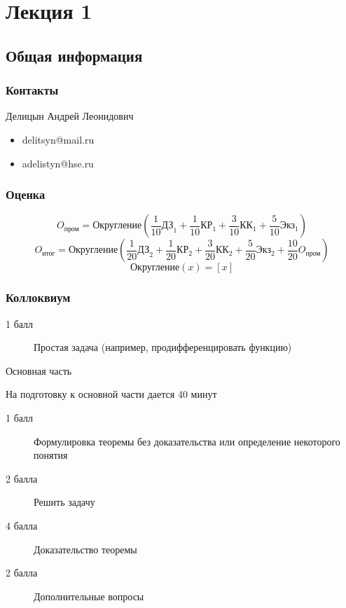 \section{Лекция 1}

\subsection{Общая информация}
\subsubsection{Контакты}
Делицын Андрей Леонидович
\begin{itemize}[noitemsep]
	\item delitsyn@mail.ru
	\item adelistyn@hse.ru
\end{itemize}

\subsubsection{Оценка}
\[ 
	O_\text{пром} = \text{Округление}\left( 
		\frac{1}{10} \text{ДЗ}_1 + 
		\frac{1}{10} \text{КР}_1 + 
		\frac{3}{10} \text{КК}_1 + 
		\frac{5}{10} \text{Экз}_1
	\right)
\]
\[
	O_\text{итог} = \text{Округление}\left(
		\frac{1}{20} \text{ДЗ}_2 + 
		\frac{1}{20} \text{КР}_2 + 
		\frac{3}{20} \text{КК}_2 +
		\frac{5}{20} \text{Экз}_2 + 
		\frac{10}{20} O_\text{пром} 
	\right)
\]
\[
	\text{Округление}\left(x\right) = \left[ x \right] 
\]

\subsubsection{Коллоквиум}
\begin{description}
	\item [1 балл] Простая задача (например, продифференцировать функцию)
\end{description}

Основная часть

На подготовку к основной части дается 40 минут
\begin{description}
	\item [1 балл] Формулировка теоремы без доказательства или определение некоторого понятия
	\item [2 балла] Решить задачу
	\item [4 балла] Доказательство теоремы
	\item [2 балла] Дополнительные вопросы
\end{description}

